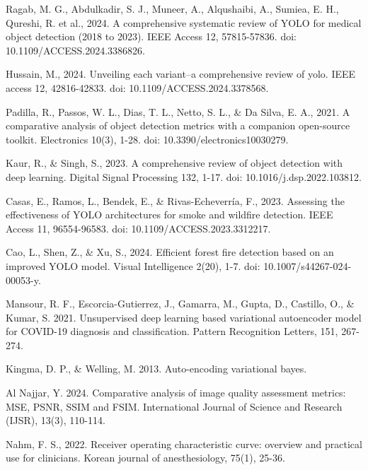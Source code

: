 \begin{thebibliography}{9}
  Ragab, M. G., Abdulkadir, S. J., Muneer, A., Alqushaibi, A.,
  Sumiea, E. H., Qureshi, R. et al., 2024. A
  comprehensive systematic review of YOLO for medical object
  detection (2018 to 2023). IEEE Access 12, 57815-57836. doi:
  10.1109/ACCESS.2024.3386826.

  Hussain, M., 2024. Unveiling each variant–a comprehensive review of
  yolo. IEEE access 12, 42816-42833. doi: 10.1109/ACCESS.2024.3378568.

  Padilla, R., Passos, W. L., Dias, T. L., Netto, S. L., \& Da Silva,
  E. A., 2021. A comparative analysis of object detection metrics
  with a companion open-source toolkit. Electronics 10(3), 1-28. doi:
  10.3390/electronics10030279.

  Kaur, R., \& Singh, S., 2023. A comprehensive review of object
  detection with deep learning. Digital Signal Processing 132, 1-17.
  doi: 10.1016/j.dsp.2022.103812.

  Casas, E., Ramos, L., Bendek, E., \& Rivas-Echeverría, F., 2023.
  Assessing the effectiveness of YOLO architectures for smoke and
  wildfire detection. IEEE Access 11, 96554-96583. doi:
  10.1109/ACCESS.2023.3312217.

  Cao, L., Shen, Z., \& Xu, S., 2024. Efficient forest fire detection
  based on an improved YOLO model. Visual Intelligence 2(20), 1-7.
  doi: 10.1007/s44267-024-00053-y.

  Mansour, R. F., Escorcia-Gutierrez, J., Gamarra, M., Gupta, D.,
  Castillo, O., \& Kumar, S. 2021. Unsupervised deep learning based
  variational autoencoder model for COVID-19 diagnosis and
  classification. Pattern Recognition Letters, 151, 267-274.

  Kingma, D. P., \& Welling, M. 2013. Auto-encoding
  variational bayes.

  Al Najjar, Y. 2024. Comparative analysis of image quality
  assessment metrics: MSE, PSNR, SSIM and FSIM. International Journal
  of Science and Research (IJSR), 13(3), 110-114.

  Nahm, F. S., 2022. Receiver operating characteristic curve:
  overview and practical use for clinicians. Korean journal of
  anesthesiology, 75(1), 25-36.

\end{thebibliography}
